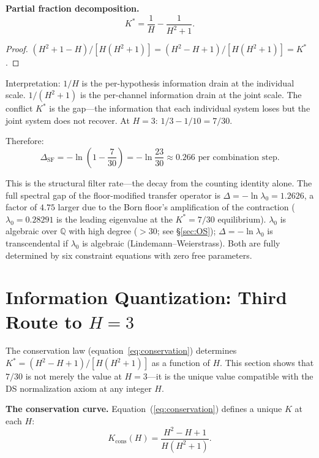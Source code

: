 \documentclass[11pt,a4paper]{article}
\theoremstyle{definition}
\theoremstyle{remark}
\begin{document}
\textbf{Partial fraction decomposition.}
\begin{equation}\label{eq:partial}
K^*=\frac{1}{H}-\frac{1}{H^2+1}.
\end{equation}

\begin{proof}
$(H^2+1-H)/[H(H^2+1)]=(H^2-H+1)/[H(H^2+1)]=K^*$.
\end{proof}

Interpretation: $1/H$ is the per-hypothesis information drain at the individual scale. $1/(H^2+1)$ is the per-channel information drain at the joint scale. The conflict $K^*$ is the gap---the information that each individual system loses but the joint system does not recover. At $H=3$: $1/3-1/10=7/30$.

Therefore:
\begin{equation}\label{eq:Delta}
\Delta_{\mathrm{SF}}=-\ln\!\left(1-\frac{7}{30}\right)=-\ln\frac{23}{30}\approx 0.266\text{ per combination step.}
\end{equation}

This is the structural filter rate---the decay from the counting identity alone. The full spectral gap of the floor-modified transfer operator is $\Delta=-\ln\lambda_0=1.2626$, a factor of $4.75$ larger due to the Born floor's amplification of the contraction ($\lambda_0=0.28291$ is the leading eigenvalue at the $K^*=7/30$ equilibrium). $\lambda_0$ is algebraic over $\mathbb{Q}$ with high degree ($>30$; see \S\ref{sec:OS}); $\Delta=-\ln\lambda_0$ is transcendental if $\lambda_0$ is algebraic (Lindemann--Weierstrass). Both are fully determined by six constraint equations with zero free parameters.


\section{Information Quantization: Third Route to $H=3$}\label{sec:quantization}

The conservation law (equation~\ref{eq:conservation}) determines $K^*=(H^2-H+1)/[H(H^2+1)]$ as a function of $H$. This section shows that $7/30$ is not merely the value at $H=3$---it is the unique value compatible with the DS normalization axiom at any integer $H$.

\textbf{The conservation curve.} Equation~(\ref{eq:conservation}) defines a unique $K$ at each $H$:
\begin{equation}\label{eq:Kcons}
K_{\mathrm{cons}}(H)=\frac{H^2-H+1}{H(H^2+1)}.
\end{equation}
\end{document}
